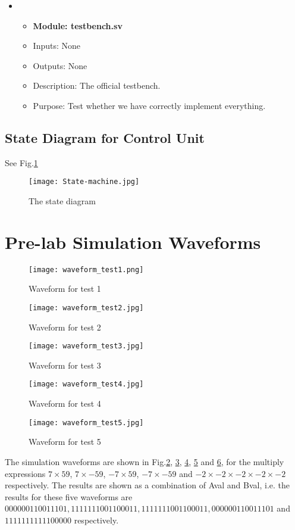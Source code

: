 \documentclass[11pt]{article}
\begin{document}
\begin{itemize}
    \item
    \begin{itemize}
        \item \textbf{Module: testbench.sv}
        \item Inputs: None
        \item Outputs: None
        \item Description: The official testbench.
        \item Purpose: Test whether we have correctly implement everything.
    \end{itemize}

\end{itemize}


\subsection{State Diagram for Control Unit}
See Fig.\ref{state_diagram}
\begin{figure}[h]
    \centering
    \texttt{[image: State-machine.jpg]}
    \caption{The state diagram}
    \label{state_diagram}
\end{figure}

\section{Pre-lab Simulation Waveforms}
\begin{figure}[h]
    \centering
    \texttt{[image: waveform\_test1.png]}
    \caption{Waveform for test 1}
    \label{test1}
\end{figure}
\begin{figure}[h]
    \centering
    \texttt{[image: waveform\_test2.jpg]}
    \caption{Waveform for test 2}
    \label{test2}
\end{figure}
\begin{figure}[h]
    \centering
    \texttt{[image: waveform\_test3.jpg]}
    \caption{Waveform for test 3}
    \label{test3}
\end{figure}
\begin{figure}[h]
    \centering
    \texttt{[image: waveform\_test4.jpg]}
    \caption{Waveform for test 4}
    \label{test4}
\end{figure}
\begin{figure}[h]
    \centering
    \texttt{[image: waveform\_test5.jpg]}
    \caption{Waveform for test 5}
    \label{test5}
\end{figure}
The simulation waveforms are shown in Fig.\ref{test1}, \ref{test2}, \ref{test3}, \ref{test4} and \ref{test5}, for the multiply expressions $7\times 59$, $7\times -59$, $-7\times 59$, $-7\times -59$ and $-2\times -2\times -2\times -2\times -2$ respectively. The results are shown as a combination of Aval and Bval, i.e. the results for these five waveforms are $000000110011101, 1111111001100011, 1111111001100011, 000000110011101$ and $1111111111100000$ respectively.
\end{document}
